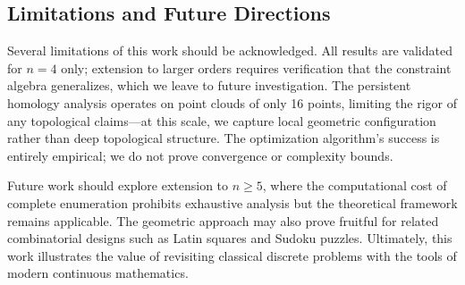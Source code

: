 \subsection{Limitations and Future Directions}

Several limitations of this work should be acknowledged. All results are validated for $n=4$ only; extension to larger orders requires verification that the constraint algebra generalizes, which we leave to future investigation. The persistent homology analysis operates on point clouds of only 16 points, limiting the rigor of any topological claims---at this scale, we capture local geometric configuration rather than deep topological structure. The optimization algorithm's success is entirely empirical; we do not prove convergence or complexity bounds.

Future work should explore extension to $n \geq 5$, where the computational cost of complete enumeration prohibits exhaustive analysis but the theoretical framework remains applicable. The geometric approach may also prove fruitful for related combinatorial designs such as Latin squares and Sudoku puzzles. Ultimately, this work illustrates the value of revisiting classical discrete problems with the tools of modern continuous mathematics.
